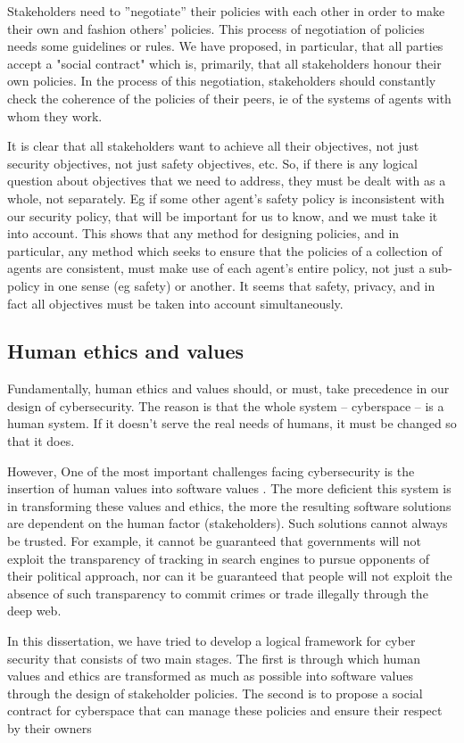 Stakeholders need to ''negotiate'' their policies with each other in
order to make their own and fashion others' policies. This process of
negotiation of policies needs some guidelines or rules. We have proposed,
in particular, that all parties accept a "social contract" which is,
primarily, that all stakeholders honour their own policies. In the
process of this negotiation, stakeholders should constantly check the
coherence of the policies of their peers, ie of the systems of agents
with whom they work.

It is clear that all stakeholders want to achieve all their objectives,
not just security objectives, not just safety objectives, etc. So, if
there is any logical question about objectives that we need to address,
they must be dealt with as a whole, not separately. Eg if some other
agent's safety policy is inconsistent with our security policy, that will
be important for us to know, and we must take it into account. This
shows that any method for designing policies, and in particular,
any method which seeks to ensure that the policies of a collection of
agents are consistent, must make use of each agent's entire policy,
not just a sub-policy in one sense (eg safety) or another. It seems
that safety, privacy, and in fact all objectives must be taken into
account simultaneously.
\subsection{Human ethics and values}
Fundamentally, human ethics and values should, or must, take precedence in our design of cybersecurity. The reason is that the whole system -- cyberspace -- is a human system. If it doesn't serve the real needs of humans, it must be changed so that it does. 

However, One of the most important challenges facing cybersecurity is the insertion of human values into software values .   
The more deficient this system is in transforming these values and ethics, the more the resulting software solutions are dependent on the human factor (stakeholders). Such solutions cannot always be trusted. For example, it cannot be guaranteed that governments will not exploit the transparency of tracking in search engines to pursue opponents of their political approach, nor can it be guaranteed that people will not exploit the absence of such transparency to commit crimes or trade illegally through the deep web. 

In this dissertation, we have tried to develop a logical framework for cyber security that consists of two main stages. The first is through which human values and ethics are transformed as much as possible into software values through the design of stakeholder policies. The second is to propose a social contract for cyberspace that can manage these policies and ensure their respect by their owners

